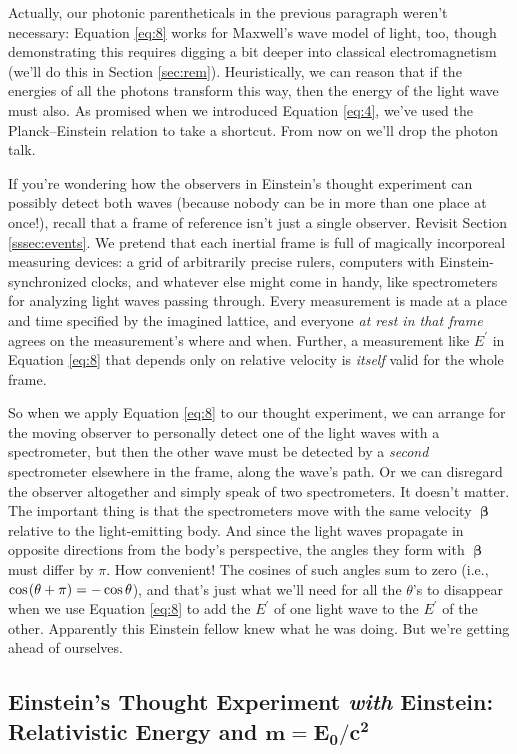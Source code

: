 \documentclass[12pt]{article}
\newcommand{\vvbeta}{\bm{\upbeta}}
\begin{document}
Actually, our photonic parentheticals in the previous paragraph weren't necessary: Equation \ref{eq:8} works for Maxwell's wave model of light, too, though demonstrating this requires digging a bit deeper into classical electromagnetism (we'll do this in Section \ref{sec:rem}). Heuristically, we can reason that if the energies of all the photons transform this way, then the energy of the light wave must also. As promised when we introduced Equation \ref{eq:4}, we've used the Planck--Einstein relation to take a shortcut. From now on we'll drop the photon talk.

If you're wondering how the observers in Einstein's thought experiment can possibly detect both waves (because nobody can be in more than one place at once!), recall that a frame of reference isn't just a single observer. Revisit Section \ref{sssec:events}. We pretend that each inertial frame is full of magically incorporeal measuring devices: a grid of arbitrarily precise rulers, computers with Einstein-synchronized clocks, and whatever else might come in handy, like spectrometers for analyzing light waves passing through. Every measurement is made at a place and time specified by the imagined lattice, and everyone \emph{at rest in that frame} agrees on the measurement's where and when. Further, a measurement like $E^\prime$ in Equation \ref{eq:8} that depends only on relative velocity is \emph{itself} valid for the whole frame.

So when we apply Equation \ref{eq:8} to our thought experiment, we can arrange for the moving observer to personally detect one of the light waves with a spectrometer, but then the other wave must be detected by a \emph{second} spectrometer elsewhere in the frame, along the wave's path. Or we can disregard the observer altogether and simply speak of two spectrometers. It doesn't matter. The important thing is that the spectrometers move with the same velocity $\vvbeta$ relative to the light-emitting body. And since the light waves propagate in opposite directions from the body's perspective, the angles they form with $\vvbeta$ must differ by $\pi$. How convenient! The cosines of such angles sum to zero (i.e., $\cos \mkern1.5mu (\theta+\pi)=-\cos\theta$), and that's just what we'll need for all the $\theta$'s to disappear when we use Equation \ref{eq:8} to add the $E^{\prime}$ of one light wave to the $E^{\prime}$ of the other. Apparently this Einstein fellow knew what he was doing. But we're getting ahead of ourselves.


\subsection[Einstein’s Thought Experiment \emph{with} Einstein: Relativistic Energy and \texorpdfstring{$m=E_0/c^2$}{m=E₀/c²}]{Einstein's Thought Experiment \emph{with} Einstein:\\Relativistic Energy and $\bm{m=E_0/c^2}$}\label{ssec:re}
\end{document}
